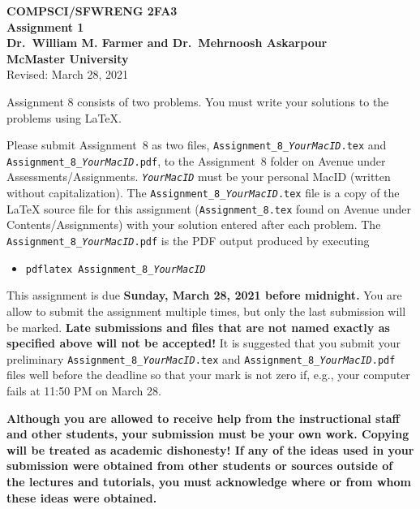 \documentclass[11pt,fleqn]{article}
\begin{document}
	
	\begin{center}
		
		{\large \textbf{COMPSCI/SFWRENG 2FA3}}\\[2mm]
		{\huge \textbf{Assignment 1}}\\[6mm]
		{\large \textbf{Dr.~William M. Farmer and Dr.~Mehrnoosh Askarpour}}\\[2mm]
		{\large \textbf{McMaster University}}\\[6mm]
		{\large Revised: March 28, 2021}
		
	\end{center}
	
	\medskip
	
	Assignment 8 consists of two problems.  You must write your solutions
	to the problems using LaTeX.
	
	Please submit Assignment~8 as two files,
	\texttt{Assignment\_8\_\emph{YourMacID}.tex} and
	\texttt{Assignment\_8\_\emph{YourMacID}.pdf}, to the Assignment~8
	folder on Avenue under Assessments/Assignments.
	\texttt{\emph{YourMacID}} must be your personal MacID (written without
	capitalization).  The \texttt{Assignment\_8\_\emph{YourMacID}.tex}
	file is a copy of the LaTeX source file for this assignment
	(\texttt{Assignment\_8.tex} found on Avenue under
	Contents/Assignments) with your solution entered after each problem.
	The \texttt{Assignment\_8\_\emph{YourMacID}.pdf} is the PDF output
	produced by executing
	
	\begin{itemize}
		
		\item[] \texttt{pdflatex Assignment\_8\_\emph{YourMacID}}
		
	\end{itemize}
	
	This assignment is due \textbf{Sunday, March 28, 2021 before
		midnight.}  You are allow to submit the assignment multiple times,
	but only the last submission will be marked.  \textbf{Late submissions
		and files that are not named exactly as specified above will not be
		accepted!}  It is suggested that you submit your preliminary
	\texttt{Assignment\_8\_\emph{YourMacID}.tex} and
	\texttt{Assignment\_8\_\emph{YourMacID}.pdf} files well before the
	deadline so that your mark is not zero if, e.g., your computer fails
	at 11:50 PM on March 28.
	
	\textbf{Although you are allowed to receive help from the
		instructional staff and other students, your submission must be your
		own work.  Copying will be treated as academic dishonesty! If any of
		the ideas used in your submission were obtained from other students
		or sources outside of the lectures and tutorials, you must
		acknowledge where or from whom these ideas were obtained.}
	
\end{document}
